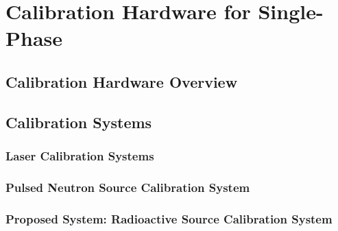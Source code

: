 \chapter{Calibration Hardware for Single-Phase}
\label{ch:sp-calib}

\section{Calibration Hardware Overview}
\label{sec:sp-calib-ov}




\section{Calibration Systems}
\subsection{Laser Calibration Systems}
\label{sec:sp-calib-sys-las}









\subsection{Pulsed Neutron Source Calibration System}
\label{sec:sp-calib-sys-pns}
 



\subsection{Proposed System: Radioactive Source Calibration System}
\label{sec:sp-calib-sys-rs}


 

